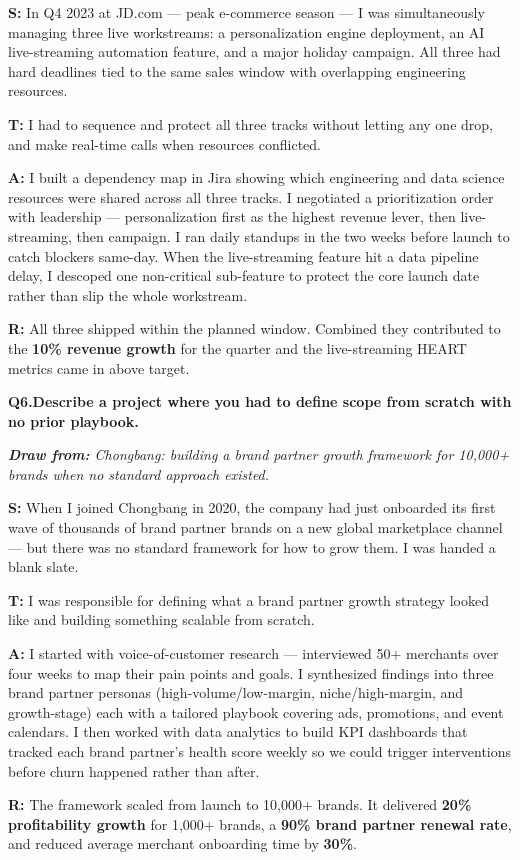 \documentclass[10pt, letterpaper]{article}
\newcommand{\q}[2]{%
    \smallskip
    \noindent\textbf{\small Q#1.}\quad\textbf{#2}
    \vspace{3pt}
}
\newcommand{\hint}[1]{%
    \begin{notebox}
    \footnotesize\textit{\textbf{Draw from:} #1}
    \end{notebox}
}
\newcommand{\s}[1]{\textbf{\textcolor{starlabel}{S:}} #1}
\newcommand{\ta}[1]{\textbf{\textcolor{starlabel}{T:}} #1}
\newcommand{\ac}[1]{\textbf{\textcolor{starlabel}{A:}} #1}
\newcommand{\res}[1]{\textbf{\textcolor{starlabel}{R:}} #1}
\begin{document}
\begin{answerbox}
\footnotesize
\s{In Q4 2023 at JD.com --- peak e-commerce season --- I was simultaneously managing three live workstreams: a personalization engine deployment, an AI live-streaming automation feature, and a major holiday campaign. All three had hard deadlines tied to the same sales window with overlapping engineering resources.}

\medskip
\ta{I had to sequence and protect all three tracks without letting any one drop, and make real-time calls when resources conflicted.}

\medskip
\ac{I built a dependency map in Jira showing which engineering and data science resources were shared across all three tracks. I negotiated a prioritization order with leadership --- personalization first as the highest revenue lever, then live-streaming, then campaign. I ran daily standups in the two weeks before launch to catch blockers same-day. When the live-streaming feature hit a data pipeline delay, I descoped one non-critical sub-feature to protect the core launch date rather than slip the whole workstream.}

\medskip
\res{All three shipped within the planned window. Combined they contributed to the \textbf{10\% revenue growth} for the quarter and the live-streaming HEART metrics came in above target.}
\end{answerbox}

\q{6}{Describe a project where you had to define scope from scratch with no prior playbook.}
\hint{Chongbang: building a brand partner growth framework for 10,000+ brands when no standard approach existed.}

\begin{answerbox}
\footnotesize
\s{When I joined Chongbang in 2020, the company had just onboarded its first wave of thousands of brand partner brands on a new global marketplace channel --- but there was no standard framework for how to grow them. I was handed a blank slate.}

\medskip
\ta{I was responsible for defining what a brand partner growth strategy looked like and building something scalable from scratch.}

\medskip
\ac{I started with voice-of-customer research --- interviewed 50+ merchants over four weeks to map their pain points and goals. I synthesized findings into three brand partner personas (high-volume/low-margin, niche/high-margin, and growth-stage) each with a tailored playbook covering ads, promotions, and event calendars. I then worked with data analytics to build KPI dashboards that tracked each brand partner's health score weekly so we could trigger interventions before churn happened rather than after.}

\medskip
\res{The framework scaled from launch to 10,000+ brands. It delivered \textbf{20\% profitability growth} for 1,000+ brands, a \textbf{90\% brand partner renewal rate}, and reduced average merchant onboarding time by \textbf{30\%}.}
\end{answerbox}
\end{document}
